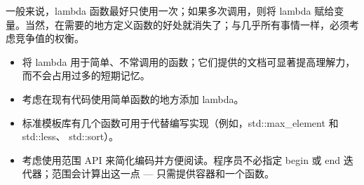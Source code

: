 一般来说，lambda 函数最好只使用一次；如果多次调用，则将 lambda 赋给变量。当然，在需要的地方定义函数的好处就消失了；与几乎所有事情一样，必须考虑竞争值的权衡。


\begin{itemize}
\item
将 lambda 用于简单、不常调用的函数；它们提供的文档可显著提高理解力，而不会占用过多的短期记忆。

\item
考虑在现有代码使用简单函数的地方添加 lambda。

\item
标准模板库有几个函数可用于代替编写实现（例如，std::max\_element 和 std::less、 std::sort）。

\item
考虑使用范围 API 来简化编码并方便阅读。程序员不必指定 begin 或 end 迭代器；范围会计算出这一点 — 只需提供容器和一个函数。
\end{itemize}









